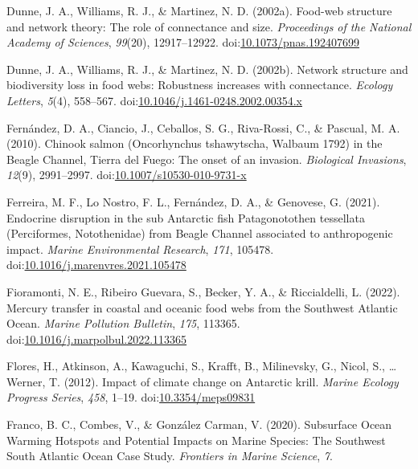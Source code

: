 \documentclass[
]{article}
\newlength{\cslhangindent}
\newenvironment{CSLReferences}[2] %
 {\begin{list}{}{%
  \setlength{\itemindent}{0pt}
  \setlength{\leftmargin}{0pt}
  \setlength{\parsep}{0pt}
  \ifodd #1
   \setlength{\leftmargin}{\cslhangindent}
   \setlength{\itemindent}{-1\cslhangindent}
  \fi
  \setlength{\itemsep}{#2\baselineskip}}}
 {\end{list}}
\begin{document}
\begin{CSLReferences}{1}{0}
Dunne, J. A., Williams, R. J., \& Martinez, N. D. (2002a). Food-web
structure and network theory: {The} role of connectance and size.
\emph{Proceedings of the National Academy of Sciences}, \emph{99}(20),
12917--12922.
doi:\href{https://doi.org/10.1073/pnas.192407699}{10.1073/pnas.192407699}

Dunne, J. A., Williams, R. J., \& Martinez, N. D. (2002b). Network
structure and biodiversity loss in food webs: Robustness increases with
connectance. \emph{Ecology Letters}, \emph{5}(4), 558--567.
doi:\href{https://doi.org/10.1046/j.1461-0248.2002.00354.x}{10.1046/j.1461-0248.2002.00354.x}

Fernández, D. A., Ciancio, J., Ceballos, S. G., Riva-Rossi, C., \&
Pascual, M. A. (2010). Chinook salmon ({Oncorhynchus} tshawytscha,
{Walbaum} 1792) in the {Beagle Channel}, {Tierra} del {Fuego}: The onset
of an invasion. \emph{Biological Invasions}, \emph{12}(9), 2991--2997.
doi:\href{https://doi.org/10.1007/s10530-010-9731-x}{10.1007/s10530-010-9731-x}

Ferreira, M. F., Lo Nostro, F. L., Fernández, D. A., \& Genovese, G.
(2021). Endocrine disruption in the sub {Antarctic} fish
{Patagonotothen} tessellata ({Perciformes}, {Notothenidae}) from {Beagle
Channel} associated to anthropogenic impact. \emph{Marine Environmental
Research}, \emph{171}, 105478.
doi:\href{https://doi.org/10.1016/j.marenvres.2021.105478}{10.1016/j.marenvres.2021.105478}

Fioramonti, N. E., Ribeiro Guevara, S., Becker, Y. A., \& Riccialdelli,
L. (2022). Mercury transfer in coastal and oceanic food webs from the
{Southwest Atlantic Ocean}. \emph{Marine Pollution Bulletin},
\emph{175}, 113365.
doi:\href{https://doi.org/10.1016/j.marpolbul.2022.113365}{10.1016/j.marpolbul.2022.113365}

Flores, H., Atkinson, A., Kawaguchi, S., Krafft, B., Milinevsky, G.,
Nicol, S., \ldots{} Werner, T. (2012). Impact of climate change on
{Antarctic} krill. \emph{Marine Ecology Progress Series}, \emph{458},
1--19. doi:\href{https://doi.org/10.3354/meps09831}{10.3354/meps09831}

Franco, B. C., Combes, V., \& González Carman, V. (2020). Subsurface
{Ocean Warming Hotspots} and {Potential Impacts} on {Marine Species}:
{The Southwest South Atlantic Ocean Case Study}. \emph{Frontiers in
Marine Science}, \emph{7}.


\end{CSLReferences}
\end{document}
